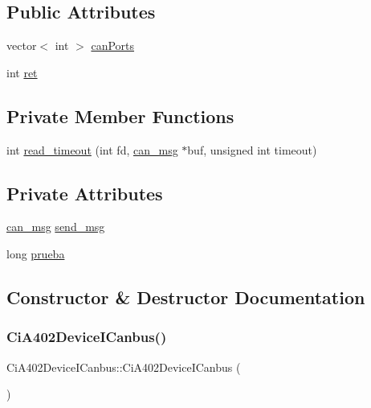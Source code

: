 \subsection*{Public Attributes}
\begin{DoxyCompactItemize}
\item 
vector$<$ int $>$ \hyperlink{classCiA402DeviceICanbus_a456534a394e4072025f2528938d1070d}{can\+Ports}
\item 
int \hyperlink{classCiA402DeviceICanbus_af6cf1493b669ce0415cefed7d84e5710}{ret}
\end{DoxyCompactItemize}
\subsection*{Private Member Functions}
\begin{DoxyCompactItemize}
\item 
int \hyperlink{classCiA402DeviceICanbus_a2ef5507ddae8411aae5b6e47e611ab92}{read\+\_\+timeout} (int fd, \hyperlink{structcan__msg}{can\+\_\+msg} $\ast$buf, unsigned int timeout)
\end{DoxyCompactItemize}
\subsection*{Private Attributes}
\begin{DoxyCompactItemize}
\item 
\hyperlink{structcan__msg}{can\+\_\+msg} \hyperlink{classCiA402DeviceICanbus_a47d8ee98f0f3569874a4018268ab1fb5}{send\+\_\+msg}
\item 
long \hyperlink{classCiA402DeviceICanbus_aa3ab38e7395ad35b3cc28281352b5e40}{prueba}
\end{DoxyCompactItemize}


\subsection{Constructor \& Destructor Documentation}
\mbox{\label{classCiA402DeviceICanbus_a557d59fe9c75dbdd0fc2cf2b3340e95a}} 
\subsubsection{\texorpdfstring{Ci\+A402\+Device\+I\+Canbus()}{CiA402DeviceICanbus()}\hspace{0.1cm}{\footnotesize\ttfamily [1/2]}}
{\footnotesize\ttfamily Ci\+A402\+Device\+I\+Canbus\+::\+Ci\+A402\+Device\+I\+Canbus (\begin{DoxyParamCaption}{ }\end{DoxyParamCaption})}

